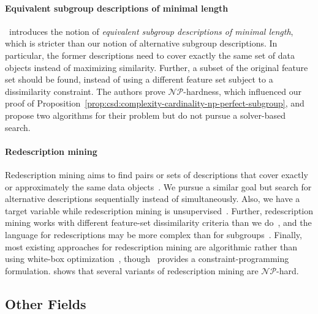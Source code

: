 \paragraph{Equivalent subgroup descriptions of minimal length}

\cite{boley2009non}~introduces the notion of \emph{equivalent subgroup descriptions of minimal length}, which is stricter than our notion of alternative subgroup descriptions.
In particular, the former descriptions need to cover exactly the same set of data objects instead of maximizing similarity.
Further, a subset of the original feature set should be found, instead of using a different feature set subject to a dissimilarity constraint.
The authors prove $\mathcal{NP}$-hardness, which influenced our proof of Proposition~\ref{prop:csd:complexity-cardinality-np-perfect-subgroup}, and propose two algorithms for their problem but do not pursue a solver-based search.

\paragraph{Redescription mining}

Redescription mining aims to find pairs or sets of descriptions that cover exactly or approximately the same data objects~\cite{galbrun2017redescription, ramakrishnan2004turning}.
We pursue a similar goal but search for alternative descriptions sequentially instead of simultaneously.
Also, we have a target variable while redescription mining is unsupervised~\cite{ramakrishnan2004turning}.
Further, redescription mining works with different feature-set dissimilarity criteria than we do~\cite{galbrun2017redescription, gallo2008finding, mihelcic2023complexity, parida2005redescription}, and the language for redescriptions may be more complex than for subgroups~\cite{galbrun2017redescription, gallo2008finding}.
Finally, most existing approaches for redescription mining are algorithmic rather than using white-box optimization~\cite{galbrun2017redescription, mihelcic2023complexity}, though~\cite{guns2013kpattern} provides a constraint-programming formulation.
\cite{mihelcic2023complexity} shows that several variants of redescription mining are $\mathcal{NP}$-hard.

\subsection{Other Fields}
\label{sec:related-work:alternatives:other-fields}

